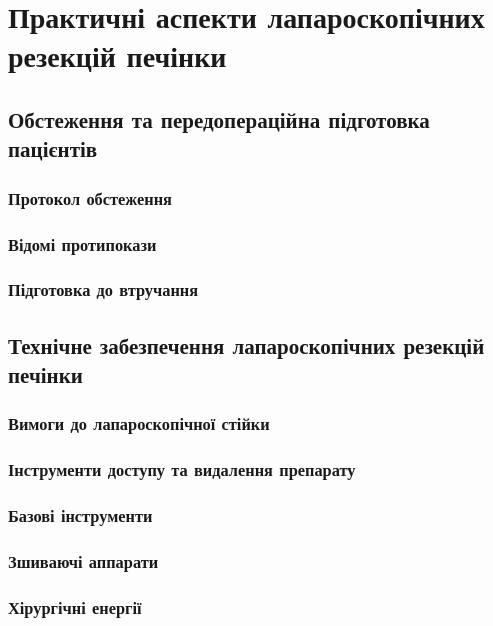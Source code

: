 \chapter{Практичні аспекти лапароскопічних резекцій печінки}
\begin{refsection}

\section{Обстеження та передопераційна підготовка пацієнтів}

\subsection{Протокол обстеження}

\subsection{Відомі протипокази}

\subsection{Підготовка до втручання}


\section{Технічне забезпечення лапароскопічних резекцій печінки}

\subsection{Вимоги до лапароскопічної стійки}

\subsection{Інструменти доступу та видалення препарату}

\subsection{Базові інструменти}

\subsection{Зшиваючі аппарати}

\subsection{Хірургічні енергії}


\end{refsection}

